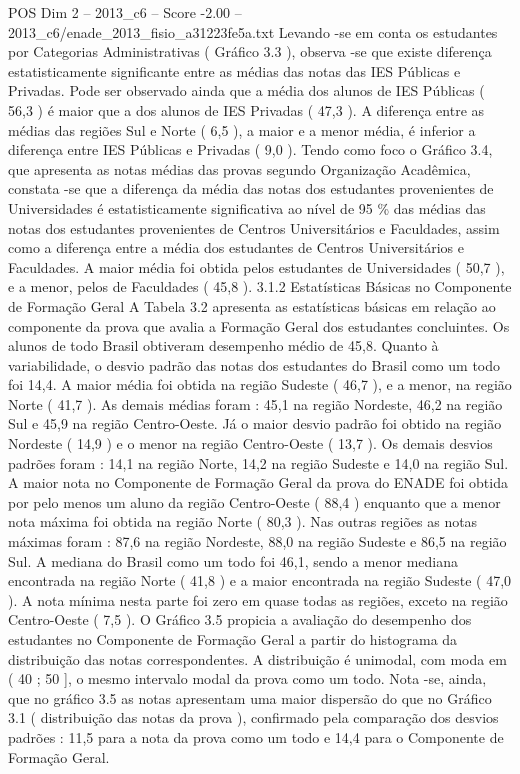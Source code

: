 \begin{textsample}{POS Dim 2 – 2013\_c6 – Score -2.00 – 2013\_c6/enade\_2013\_fisio\_a31223fe5a.txt}
Levando -se em conta os estudantes por Categorias Administrativas ( Gráfico 3.3 ), observa -se que existe diferença estatisticamente significante entre as médias das notas das IES Públicas e Privadas.
Pode ser observado ainda que a média dos alunos de IES Públicas ( 56,3 ) é maior que a dos alunos de IES Privadas ( 47,3 ).
A diferença entre as médias das regiões Sul e Norte ( 6,5 ), a maior e a menor média, é inferior a diferença entre IES Públicas e Privadas ( 9,0 ).
Tendo como foco o Gráfico 3.4, que apresenta as notas médias das provas segundo Organização Acadêmica, constata -se que a diferença da média das notas dos estudantes provenientes de Universidades é estatisticamente significativa ao nível de 95 \% das médias das notas dos estudantes provenientes de Centros Universitários e Faculdades, assim como a diferença entre a média dos estudantes de Centros Universitários e Faculdades.
A maior média foi obtida pelos estudantes de Universidades ( 50,7 ), e a menor, pelos de Faculdades ( 45,8 ). 3.1.2 Estatísticas Básicas no Componente de Formação Geral A Tabela 3.2 apresenta as estatísticas básicas em relação ao componente da prova que avalia a Formação Geral dos estudantes concluintes.
Os alunos de todo Brasil obtiveram desempenho médio de 45,8.
Quanto à variabilidade, o desvio padrão das notas dos estudantes do Brasil como um todo foi 14,4.
A maior média foi obtida na região Sudeste ( 46,7 ), e a menor, na região Norte ( 41,7 ).
As demais médias foram : 45,1 na região Nordeste, 46,2 na região Sul e 45,9 na região Centro-Oeste.
Já o maior desvio padrão foi obtido na região Nordeste ( 14,9 ) e o menor na região Centro-Oeste ( 13,7 ).
Os demais desvios padrões foram : 14,1 na região Norte, 14,2 na região Sudeste e 14,0 na região Sul.
A maior nota no Componente de Formação Geral da prova do ENADE foi obtida por pelo menos um aluno da região Centro-Oeste ( 88,4 ) enquanto que a menor nota máxima foi obtida na região Norte ( 80,3 ).
Nas outras regiões as notas máximas foram : 87,6 na região Nordeste, 88,0 na região Sudeste e 86,5 na região Sul.
A mediana do Brasil como um todo foi 46,1, sendo a menor mediana encontrada na região Norte ( 41,8 ) e a maior encontrada na região Sudeste ( 47,0 ).
A nota mínima nesta parte foi zero em quase todas as regiões, exceto na região Centro-Oeste ( 7,5 ).
O Gráfico 3.5 propicia a avaliação do desempenho dos estudantes no Componente de Formação Geral a partir do histograma da distribuição das notas correspondentes.
A distribuição é unimodal, com moda em ( 40 ; 50 ], o mesmo intervalo modal da prova como um todo.
Nota -se, ainda, que no gráfico 3.5 as notas apresentam uma maior dispersão do que no Gráfico 3.1 ( distribuição das notas da prova ), confirmado pela comparação dos desvios padrões : 11,5 para a nota da prova como um todo e 14,4 para o Componente de Formação Geral.

\end{textsample}
